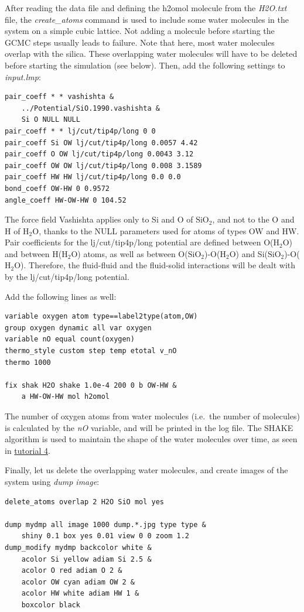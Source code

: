 \documentclass[9pt,tutorial]{livecoms}
\begin{document}
After reading the data file and defining the h2omol molecule from the \textit{H2O.txt}
file, the \textit{create\_atoms} command is used to include some water molecules
in the system on a simple cubic lattice. Not adding a molecule before starting
the GCMC steps usually leads to failure. Note that here, most water molecules
overlap with the silica. These overlapping water molecules will have to be
deleted before starting the simulation (see below). Then, add the following
settings to \textit{input.lmp}:
{\normalsize \begin{verbatim}
pair_coeff * * vashishta &
    ../Potential/SiO.1990.vashishta &
    Si O NULL NULL
pair_coeff * * lj/cut/tip4p/long 0 0
pair_coeff Si OW lj/cut/tip4p/long 0.0057 4.42
pair_coeff O OW lj/cut/tip4p/long 0.0043 3.12
pair_coeff OW OW lj/cut/tip4p/long 0.008 3.1589
pair_coeff HW HW lj/cut/tip4p/long 0.0 0.0
bond_coeff OW-HW 0 0.9572
angle_coeff HW-OW-HW 0 104.52
\end{verbatim}}
The force field Vashishta applies only to Si and O of $\text{SiO}_2$,
and not to the O and H of $\text{H}_2\text{O}$, thanks to the NULL parameters
used for atoms of types OW and HW. Pair coefficients for the lj/cut/tip4p/long
potential are defined between O($\text{H}_2\text{O}$) and between H($\text{H}_2\text{O}$)
atoms, as well as between O($\text{SiO}_2$)-O($\text{H}_2\text{O}$) and
Si($\text{SiO}_2$)-O($\text{H}_2\text{O}$). Therefore, the fluid-fluid and the
fluid-solid interactions will be dealt with by the lj/cut/tip4p/long potential.

Add the following lines as well:
{\normalsize \begin{verbatim}
variable oxygen atom type==label2type(atom,OW)
group oxygen dynamic all var oxygen
variable nO equal count(oxygen)
thermo_style custom step temp etotal v_nO
thermo 1000

fix shak H2O shake 1.0e-4 200 0 b OW-HW &
    a HW-OW-HW mol h2omol
\end{verbatim}}
The number of oxygen atoms from water molecules (i.e.~the number of molecules)
is calculated by the \textit{nO} variable, and will be printed in the log file.
The SHAKE algorithm is used to maintain the shape of the water molecules over time,
as seen in \hyperref[sheared-confined-label]{tutorial 4}.

Finally, let us delete the overlapping water molecules, and create images
of the system using \textit{dump image}:
{\normalsize \begin{verbatim}
delete_atoms overlap 2 H2O SiO mol yes

dump mydmp all image 1000 dump.*.jpg type type &
    shiny 0.1 box yes 0.01 view 0 0 zoom 1.2
dump_modify mydmp backcolor white &
    acolor Si yellow adiam Si 2.5 &
    acolor O red adiam O 2 &
    acolor OW cyan adiam OW 2 &
    acolor HW white adiam HW 1 &
    boxcolor black
\end{verbatim}}
\end{document}
